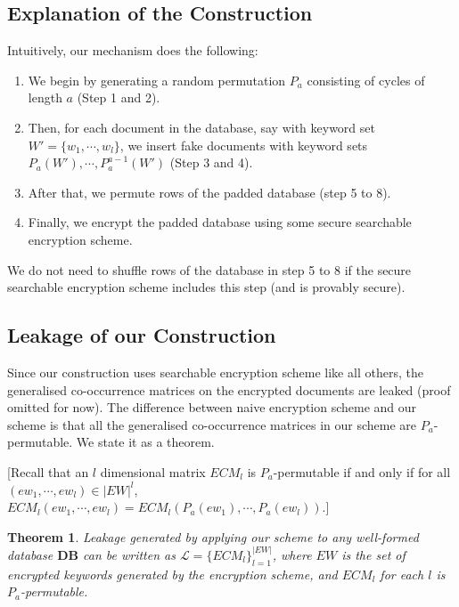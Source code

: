 \documentclass{article}
\newcommand{\db}{\textbf{DB}}
\newcommand{\kwset}{W}
\newcommand{\ekwset}{EW}
\newcommand{\kw}{w}
\newcommand{\ekw}{ew}
\newcommand{\ecmatrix}{ECM}
\newtheorem{theorem}{Theorem}
\begin{document}
\subsection{Explanation of the Construction}
Intuitively, our mechanism does the following:
\begin{enumerate}
	\item We begin by generating a random permutation $P_a$ consisting of cycles of length $a$ (Step 1 and 2).
	\item Then, for each document in the database, say with keyword set $\kwset' = \{\kw_1, \cdots, \kw_l\}$, we insert fake documents with keyword sets $P_a(\kwset'), \cdots, P_a^{a-1}(\kwset')$ (Step 3 and 4).
	\item After that, we permute rows of the padded database (step 5 to 8).
	\item Finally, we encrypt the padded database using some secure searchable encryption scheme.
\end{enumerate}

We do not need to shuffle rows of the database in step 5 to 8 if the secure searchable encryption scheme includes this step (and is provably secure).




\subsection{Leakage of our Construction}
Since our construction uses searchable encryption scheme like all others, the generalised co-occurrence matrices on the encrypted documents are leaked (proof omitted for now). The difference between naive encryption scheme and our scheme is that all the generalised co-occurrence matrices in our scheme are $P_a$-permutable. We state it as a theorem.

[Recall that an $l$ dimensional matrix $\ecmatrix_l$ is $P_a$-permutable if and only if for all $(\ekw_1, \cdots, \ekw_l) \in |\ekwset|^l$, $\ecmatrix_l(\ekw_1, \cdots, \ekw_l) = \ecmatrix_l(P_a(\ekw_1), \cdots, P_a(\ekw_l))$.]

\begin{theorem}
	Leakage generated by applying our scheme to any well-formed database $\db$ can be written as $\mathcal{L} = \{\ecmatrix_l\}_{l=1}^{|\ekwset|}$, where $\ekwset$ is the set of encrypted keywords generated by the encryption scheme, and $\ecmatrix_l$ for each $l$ is $P_a$-permutable.
\end{theorem}
\end{document}
